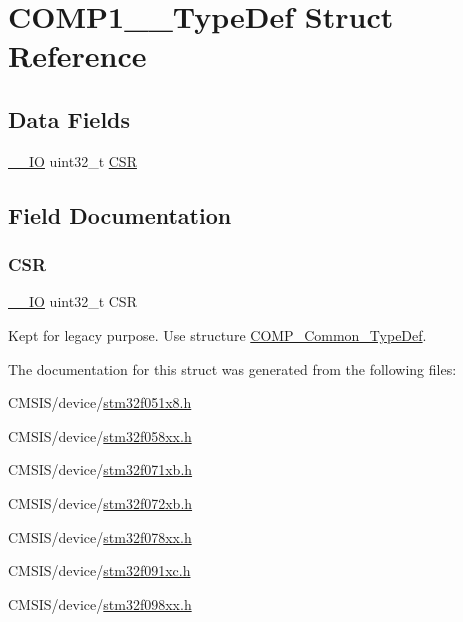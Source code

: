 \hypertarget{struct_c_o_m_p1__2___type_def}{}\section{C\+O\+M\+P1\+\_\+\_\+\+Type\+Def Struct Reference}
\label{struct_c_o_m_p1__2___type_def}
\subsection*{Data Fields}
\begin{DoxyCompactItemize}
\item 
\hyperlink{core__sc300_8h_aec43007d9998a0a0e01faede4133d6be}{\+\_\+\+\_\+\+IO} uint32\+\_\+t \hyperlink{struct_c_o_m_p1__2___type_def_a876dd0a8546697065f406b7543e27af2}{C\+SR}
\end{DoxyCompactItemize}


\subsection{Field Documentation}
\mbox{\label{struct_c_o_m_p1__2___type_def_a876dd0a8546697065f406b7543e27af2}} 
\subsubsection{\texorpdfstring{C\+SR}{CSR}}
{\footnotesize\ttfamily \hyperlink{core__sc300_8h_aec43007d9998a0a0e01faede4133d6be}{\+\_\+\+\_\+\+IO} uint32\+\_\+t C\+SR}

Kept for legacy purpose. Use structure \textquotesingle{}\hyperlink{struct_c_o_m_p___common___type_def}{C\+O\+M\+P\+\_\+\+Common\+\_\+\+Type\+Def}\textquotesingle{}. 

The documentation for this struct was generated from the following files\+:\begin{DoxyCompactItemize}
\item 
C\+M\+S\+I\+S/device/\hyperlink{stm32f051x8_8h}{stm32f051x8.\+h}\item 
C\+M\+S\+I\+S/device/\hyperlink{stm32f058xx_8h}{stm32f058xx.\+h}\item 
C\+M\+S\+I\+S/device/\hyperlink{stm32f071xb_8h}{stm32f071xb.\+h}\item 
C\+M\+S\+I\+S/device/\hyperlink{stm32f072xb_8h}{stm32f072xb.\+h}\item 
C\+M\+S\+I\+S/device/\hyperlink{stm32f078xx_8h}{stm32f078xx.\+h}\item 
C\+M\+S\+I\+S/device/\hyperlink{stm32f091xc_8h}{stm32f091xc.\+h}\item 
C\+M\+S\+I\+S/device/\hyperlink{stm32f098xx_8h}{stm32f098xx.\+h}\end{DoxyCompactItemize}

